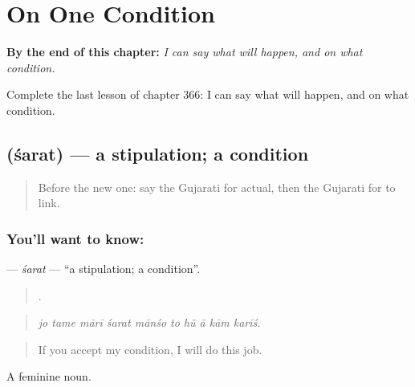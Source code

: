 
\chapter{On One Condition}
\label{ch:gu-on-one-condition}

\begin{chapteropening}
\textbf{By the end of this chapter:} \emph{I can say what will happen, and on what condition.}

Complete the last lesson of chapter 366: I can say what will happen, and on what condition.
\end{chapteropening}

\section[\texorpdfstring{\gu{શરત} (śarat)}{શરત (śarat)}]{ (śarat) — a stipulation; a condition}

\label{lesson:GU-C366-sarat}



\begin{quote}
Before the new one: say the Gujarati for actual, then the Gujarati for to link.
\end{quote}

\subsection*{You'll want to know: }
\textbf{} — \emph{śarat} — \textquotedblleft{}a stipulation; a condition\textquotedblright{}.

\begin{quote}
         .
\end{quote}

\begin{quote}
\emph{jo tame mārī śarat mānśo to hũ ā kām karīś.}
\end{quote}

\begin{quote}
If you accept my condition, I will do this job.
\end{quote}

A feminine noun.

